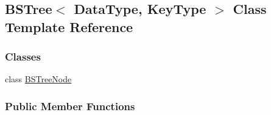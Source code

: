 \hypertarget{class_b_s_tree}{}\subsection{B\+S\+Tree$<$ Data\+Type, Key\+Type $>$ Class Template Reference}
\label{class_b_s_tree}
\subsubsection*{Classes}
\begin{DoxyCompactItemize}
\item 
class \hyperlink{class_b_s_tree_1_1_b_s_tree_node}{B\+S\+Tree\+Node}
\end{DoxyCompactItemize}
\subsubsection*{Public Member Functions}

